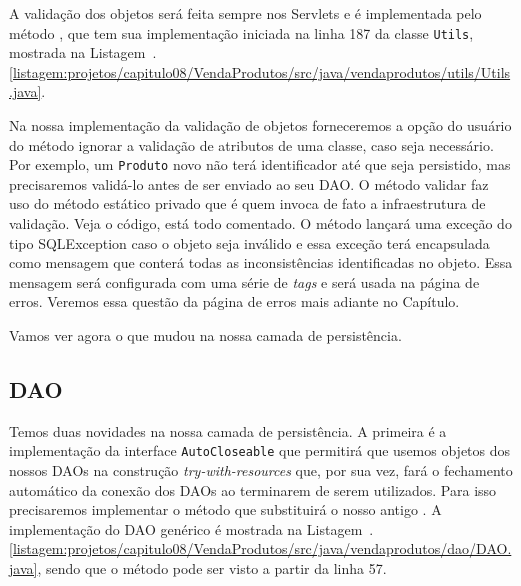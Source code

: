 A validação dos objetos será feita sempre nos Servlets e é implementada pelo método , que tem sua implementação iniciada na linha 187 da classe \texttt{Utils}, mostrada na Listagem~\thechapter.\ref{listagem:projetos/capitulo08/VendaProdutos/src/java/vendaprodutos/utils/Utils.java}.


Na nossa implementação da validação de objetos forneceremos a opção do usuário do método ignorar a validação de atributos de uma classe, caso seja necessário. Por exemplo, um \texttt{Produto} novo não terá identificador até que seja persistido, mas precisaremos validá-lo antes de ser enviado ao seu DAO. O método validar faz uso do método estático privado  que é quem invoca de fato a infraestrutura de validação. Veja o código, está todo comentado. O método  lançará uma exceção do tipo SQLException caso o objeto seja inválido e essa exceção terá encapsulada como mensagem que conterá todas as inconsistências identificadas no objeto. Essa mensagem será configurada com uma série de \textit{tags}  e será usada na página de erros. Veremos essa questão da página de erros mais adiante no Capítulo.

Vamos ver agora o que mudou na nossa camada de persistência.


\subsection{DAO}

Temos duas novidades na nossa camada de persistência. A primeira é a implementação da interface \texttt{AutoCloseable} que permitirá que usemos objetos dos nossos DAOs na construção \textit{try-with-resources} que, por sua vez, fará o fechamento automático da conexão dos DAOs ao terminarem de serem utilizados. Para isso precisaremos implementar o método  que substituirá o nosso antigo . A implementação do DAO genérico é mostrada na Listagem~\thechapter.\ref{listagem:projetos/capitulo08/VendaProdutos/src/java/vendaprodutos/dao/DAO.java}, sendo que o método  pode ser visto a partir da linha 57.


